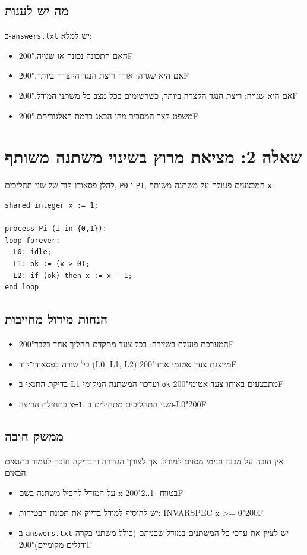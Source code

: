\documentclass[11pt,a4paper]{article}
\newcommand{\RLM}{\char"200F}
\newenvironment{englishlisting}
  {\begin{english}\begin{flushleft}}
  {\end{flushleft}\end{english}}
\begin{document}
\subsection*{מה יש לענות}
ב-\texttt{answers.txt} יש למלא:
\begin{itemize}
  \item האם התכונה נכונה או שגויה.\RLM
  \item אם היא שגויה: אורך ריצת הנגד הקצרה ביותר.\RLM
  \item אם היא שגויה: ריצת הנגד הקצרה ביותר, כשרשומים בכל מצב כל משתני המודל.\RLM
  \item משפט קצר המסביר מהו הבאג ברמת האלגוריתם.\RLM
\end{itemize}

\clearpage
\section{שאלה 2: מציאת מרוץ בשינוי משתנה משותף}
להלן פסאודו־קוד של שני תהליכים, \texttt{P0} ו-\texttt{P1}, המבצעים פעולה על משתנה משותף \texttt{x}:

\begin{englishlisting}
\begin{lstlisting}
shared integer x := 1;

process Pi (i in {0,1}):
loop forever:
  L0: idle;
  L1: ok := (x > 0);
  L2: if (ok) then x := x - 1;
end loop
\end{lstlisting}
\end{englishlisting}

\subsection*{הנחות מידול מחייבות}
\begin{itemize}
  \item המערכת פועלת בשזירה: בכל צעד מתקדם תהליך אחד בלבד\RLM
  \item כל שורה בפסאודו־קוד \textenglish{(L0, L1, L2)} מייצגת צעד אטומי אחד\RLM
  \item בדיקת התנאי ב-\textenglish{L1} ועדכון המשתנה המקומי \texttt{ok} מתבצעים באותו צעד אטומי\RLM
  \item בתחילת הריצה \texttt{x=1}, ושני התהליכים מתחילים ב-\textenglish{L0}\RLM
\end{itemize}

\subsection*{ממשק חובה}
אין חובה על מבנה פנימי מסוים למודל, אך לצורך הגדירה והבדיקה חובה לעמוד בתנאים הבאים:
\begin{itemize}
  \item על המודל להכיל משתנה בשם \textenglish{x} בטווח \textenglish{-1..2}\RLM
  \item יש להוסיף למודל \textbf{בדיוק} את תכונת הבטיחות: \textenglish{INVARSPEC x >= 0}\RLM
  \item ב-\texttt{answers.txt} יש לציין את ערכי כל המשתנים במודל שבניתם (כולל משתני בקרה ודגלים מקומיים)\RLM
\end{itemize}
\end{document}
